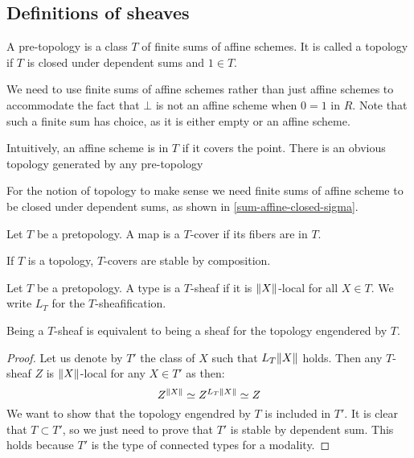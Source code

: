 \subsection{Definitions of sheaves}

\begin{definition}
A pre-topology is a class $T$ of finite sums of affine schemes. It is called a topology if $T$ is closed under dependent sums and $1\in T$.
\end{definition}

\begin{remark}
We need to use finite sums of affine schemes rather than just affine schemes to accommodate the fact that $\bot$ is not an affine scheme when $0=1$ in $R$. Note that such a finite sum has choice, as it is either empty or an affine scheme.
\end{remark}

Intuitively, an affine scheme is in $T$ if it covers the point. There is an obvious topology generated by any pre-topology

\begin{remark}
For the notion of topology to make sense we need finite sums of affine scheme to be closed under dependent sums, as shown in \cref{sum-affine-closed-sigma}.
\end{remark}

\begin{definition}
Let $T$ be a pretopology. A map is a $T$-cover if its fibers are in $T$.
\end{definition} 

If $T$ is a topology, $T$-covers are stable by composition.

\begin{definition}
Let $T$ be a pretopology. A type is a $T$-sheaf if it is $\lVert X \rVert$-local for all $X\in T$. We write $L_T$ for the $T$-sheafification.
\end{definition}

\begin{lemma}\label{topology-pretopology-same-sheaves}
Being a $T$-sheaf is equivalent to being a sheaf for the topology engendered by $T$.
\end{lemma}

\begin{proof}
Let us denote by $T'$ the class of $X$ such that $L_T\lVert X \rVert$ holds. Then any $T$-sheaf $Z$ is $\lVert X \rVert$-local for any $X\in T'$ as then: 
\[Z^{\lVert X \rVert}\simeq Z^{L_T\lVert X \rVert} \simeq Z\]
We want to show that the topology engendred by $T$ is included in $T'$. It is clear that $T\subset T'$, so we just need to prove that $T'$ is stable by dependent sum. This holds because $T'$ is the type of connected types for a modality.
\end{proof}

